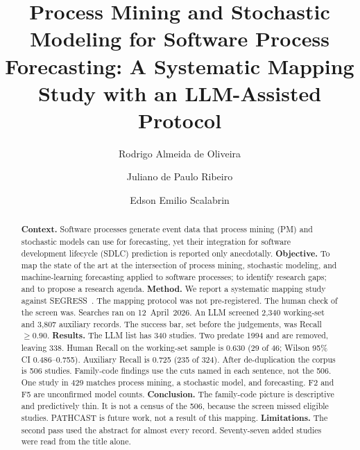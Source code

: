 \documentclass[review,3p,times]{elsarticle}
\begin{document}
\begin{frontmatter}

\title{Process Mining and Stochastic Modeling for Software Process
       Forecasting: A Systematic Mapping Study with an LLM-Assisted Protocol}

\author[pucpr]{Rodrigo Almeida de Oliveira}

\author[pucpr]{Juliano de Paulo Ribeiro}

\author[pucpr]{Edson Emilio Scalabrin}




\begin{abstract}
\textbf{Context.}
Software processes generate event data that process mining (PM) and
stochastic models can use for forecasting, yet their integration for
software development lifecycle (SDLC) prediction is reported only
anecdotally.
\textbf{Objective.}
To map the state of the art at the intersection of process mining,
stochastic modeling, and machine-learning forecasting applied to software
processes; to identify research gaps; and to propose a research agenda.
\textbf{Method.}
We report a systematic mapping study against
SEGRESS~\cite{kitchenham2023segress}. The mapping protocol was not
pre-registered. The human check of the screen was. Searches ran on
12~April~2026. An LLM screened 2{,}340 working-set and 3{,}807 auxiliary
records. The success bar, set before the judgements, was Recall $\geq 0.90$.
\textbf{Results.}
The LLM list has 340 studies. Two predate 1994 and are removed, leaving
338. Human Recall on the working-set sample is 0.630 (29 of 46; Wilson
95\% CI 0.486--0.755). Auxiliary Recall is 0.725 (235 of 324). After
de-duplication the corpus is 506 studies. Family-code findings use the
cuts named in each sentence, not the 506. One study in 429 matches
process mining, a stochastic model, and forecasting. F2 and F5 are
unconfirmed model counts.
\textbf{Conclusion.}
The family-code picture is descriptive and predictively thin. It is not a
census of the 506, because the screen missed eligible studies. PATHCAST is
future work, not a result of this mapping.
\textbf{Limitations.}
The second pass used the abstract for almost every record. Seventy-seven
added studies were read from the title alone.
\end{abstract}


\end{frontmatter}
\end{document}

